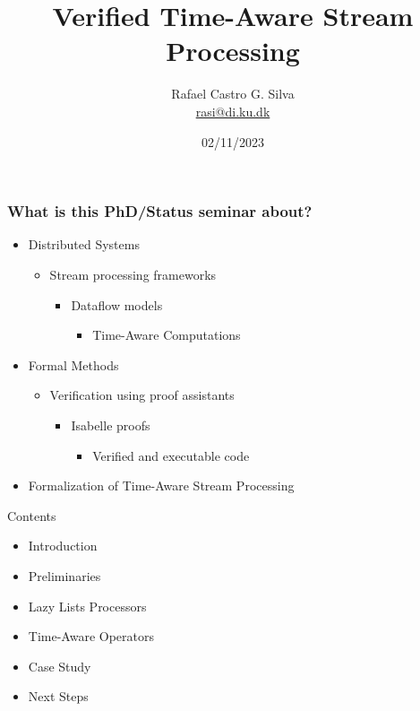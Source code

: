 \documentclass[aspectratio=169,10pt]{beamer}
\title[Verified Time-Aware Stream Processing]{Verified Time-Aware Stream Processing}
\author[Rafael Castro]{
  Rafael Castro G. Silva\\\medskip
  {\small \url{rasi@di.ku.dk}}}
\date{02/11/2023}
\institute[UCPH]{
  Department of Computer Science \\
  University of Copenhagen}
\begin{document}
\begin{frame}
  \titlepage

\end{frame}

\begin{frame}[fragile]
  \frametitle{What is this PhD/Status seminar about?}
  \begin{itemize}
    \item Distributed Systems
          \begin{itemize}
            \item Stream processing frameworks
                  \begin{itemize}
                    \item Dataflow models
                          \begin{itemize}
                            \item Time-Aware Computations
                          \end{itemize}
                  \end{itemize}
          \end{itemize}
    \item Formal Methods
          \begin{itemize}
            \item Verification using proof assistants
                  \begin{itemize}
                    \item Isabelle proofs
                          \begin{itemize}
                            \item Verified and executable code
                          \end{itemize}
                  \end{itemize}
          \end{itemize}
    \item Formalization of Time-Aware Stream Processing
  \end{itemize}
\end{frame}

\begin{frame}{Contents}
  \begin{itemize}
    \item Introduction
    \item Preliminaries
    \item Lazy Lists Processors
    \item Time-Aware Operators
    \item Case Study
    \item Next Steps
  \end{itemize}
\end{frame}
\end{document}
